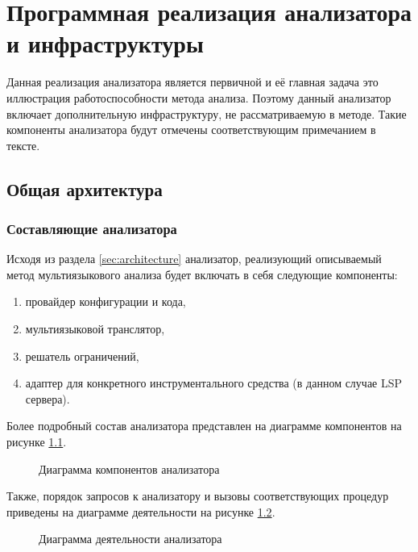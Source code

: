 \chapter{Программная реализация анализатора и инфраструктуры}

Данная реализация анализатора является первичной и её главная задача это иллюстрация работоспособности метода анализа.
Поэтому данный анализатор включает дополнительную инфраструктуру, не рассматриваемую в методе. Такие компоненты
анализатора будут отмечены соответствующим примечанием в тексте.

\section{Общая архитектура}

\subsection{Составляющие анализатора}

Исходя из раздела \ref{sec:architecture} анализатор, реализующий описываемый метод мультиязыкового анализа будет включать в себя следующие
компоненты:
\begin{enumerate}[1)]
    \item провайдер конфигурации и кода,
    \item мультиязыковой транслятор,
    \item решатель ограничений,
    \item адаптер для конкретного инструментального средства (в данном случае LSP сервера).
\end{enumerate}

Более подробный состав анализатора представлен на диаграмме компонентов на рисунке \ref{fig:components}.

\begin{figure}[H]
    \centering
    \caption{Диаграмма компонентов анализатора}
    \label{fig:components}
\end{figure}

Также, порядок запросов к анализатору и вызовы соответствующих процедур приведены на диаграмме деятельности
на рисунке \ref{fig:sequence}.

\begin{figure}[H]
    \centering
    \caption{Диаграмма деятельности анализатора}
    \label{fig:sequence}
\end{figure}

